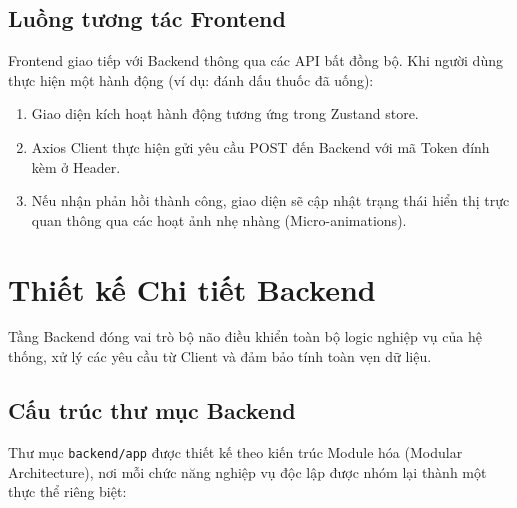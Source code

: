 \documentclass[12pt,a4paper]{report}
\begin{document}
\subsection{Luồng tương tác Frontend}

Frontend giao tiếp với Backend thông qua các API bất đồng bộ. Khi người dùng thực hiện một hành động (ví dụ: đánh dấu thuốc đã uống):
\begin{enumerate}
    \item Giao diện kích hoạt hành động tương ứng trong Zustand store.
    \item Axios Client thực hiện gửi yêu cầu POST đến Backend với mã Token đính kèm ở Header.
    \item Nếu nhận phản hồi thành công, giao diện sẽ cập nhật trạng thái hiển thị trực quan thông qua các hoạt ảnh nhẹ nhàng (Micro-animations).
\end{enumerate}

\section{Thiết kế Chi tiết Backend}

Tầng Backend đóng vai trò bộ não điều khiển toàn bộ logic nghiệp vụ của hệ thống, xử lý các yêu cầu từ Client và đảm bảo tính toàn vẹn dữ liệu.

\subsection{Cấu trúc thư mục Backend}

Thư mục \texttt{backend/app} được thiết kế theo kiến trúc Module hóa (Modular Architecture), nơi mỗi chức năng nghiệp vụ độc lập được nhóm lại thành một thực thể riêng biệt:
\end{document}
